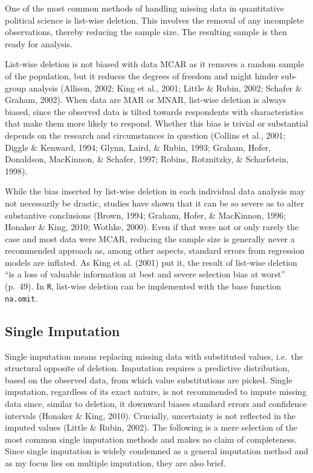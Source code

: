 \documentclass[12pt,econ]{sources/authesis}
\begin{document}
One of the most common methods of handling missing data in quantitative political science is list-wise deletion. This involves the removal of any incomplete observations, thereby reducing the sample size. The resulting sample is then ready for analysis.

List-wise deletion is not biased with data MCAR as it removes a random sample of the population, but it reduces the degrees of freedom and might hinder sub-group analysis (Allison, 2002; King et al., 2001; Little \& Rubin, 2002; Schafer \& Graham, 2002). When data are MAR or MNAR, list-wise deletion is always biased, since the observed data is tilted towards respondents with characteristics that make them more likely to respond. Whether this bias is trivial or substantial depends on the research and circumstances in question (Collins et al., 2001; Diggle \& Kenward, 1994; Glynn, Laird, \& Rubin, 1993; Graham, Hofer, Donaldson, MacKinnon, \& Schafer, 1997; Robins, Rotznitzky, \& Scharfstein, 1998).

While the bias inserted by list-wise deletion in each individual data analysis may not necessarily be drastic, studies have shown that it can be so severe as to alter substantive conclusions (Brown, 1994; Graham, Hofer, \& MacKinnon, 1996; Honaker \& King, 2010; Wothke, 2000). Even if that were not or only rarely the case and most data were MCAR, reducing the sample size is generally never a recommended approach as, among other aspects, standard errors from regression models are inflated. As King et al. (2001) put it, the result of list-wise deletion ``is a loss of valuable information at best and severe selection bias at worst'' (p.~49). In \texttt{R}, list-wise deletion can be implemented with the base function \texttt{na.omit}.

\hypertarget{ordmiss-theory-singimpute}{%
\subsection{Single Imputation}\label{ordmiss-theory-singimpute}}

Single imputation means replacing missing data with substituted values, i.e.~the structural opposite of deletion. Imputation requires a predictive distribution, based on the observed data, from which value substitutions are picked. Single imputation, regardless of its exact nature, is not recommended to impute missing data since, similar to deletion, it downward biases standard errors and confidence intervals (Honaker \& King, 2010). Crucially, uncertainty is not reflected in the imputed values (Little \& Rubin, 2002). The following is a mere selection of the most common single imputation methods and makes no claim of completeness. Since single imputation is widely condemned as a general imputation method and as my focus lies on multiple imputation, they are also brief.
\end{document}
